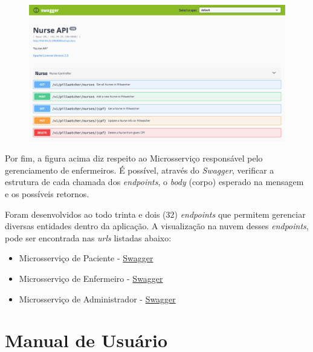 \begin{apendicesenv}
\begin{figure}[H]
    \centering
    \includegraphics[width=1.0\textwidth,page=1]{figuras/software/SwaggerUi/SwaggerUi_Nurse.png}
    \label{fig:nurse_endpoints}
\end{figure}

Por fim, a figura acima diz respeito ao Microsserviço responsável pelo gerenciamento de enfermeiros. É possível, através do \textit{Swagger}, verificar a estrutura de cada chamada dos \textit{endpoints}, o \textit{body} (corpo) esperado na mensagem e os possíveis retornos. 

Foram desenvolvidos ao todo trinta e dois (32) \textit{endpoints} que permitem gerenciar diversas entidades dentro da aplicação. A visualização na nuvem desses \textit{endpoints}, pode ser encontrada nas \textit{urls} listadas abaixo:

\begin{itemize}
    \item Microsserviço de Paciente - \href{http://192.99.25.198:8082/swagger-ui.html}{Swagger}
    \item Microsserviço de Enfermeiro - \href{http://192.99.25.198:8080/swagger-ui.html}{Swagger}
    \item Microsserviço de Administrador - \href{http://192.99.25.198:8081/swagger-ui.html}{Swagger}
\end{itemize}


\chapter{Manual de Usuário}\label{manual_usuario}


\end{apendicesenv}
